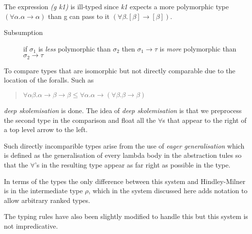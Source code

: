 The expression \textit{(g k1)} is ill-typed since \textit{k1} expects a more polymorphic type $(\forall\alpha. \alpha \rightarrow \alpha)$ than g can pass to it $(\forall\beta.[\beta] \rightarrow [\beta])$. 

\begin{description}
\item[Subsumption] if $\sigma_1$ is \textit{less} polymorphic than $\sigma_2$ then $\sigma_1 \rightarrow \tau$ is \textit{more} polymorphic than $\sigma_2 \rightarrow \tau$
\end{description}

To compare types that are isomorphic but not directly comparable due to the location of the foralls. Such as
\begin{quotation}
$\forall\alpha\beta.\alpha\rightarrow\beta\rightarrow\beta\leq\forall\alpha.\alpha\rightarrow(\forall\beta.\beta\rightarrow\beta)$
\end{quotation}

\textit{deep skolemisation} is done. The idea of \textit{deep skolemisation} is that we preprocess the second type in the comparison and float all the $\forall$s that appear to the right of a top level arrow to the left.

Such directly incomparible types arise from the use of \textit{eager generalisation} which is defined as the generalisation of every lambda body in the abstraction tules so that the $\forall$'s in the resulting type appear as far right as possible in the type.

In terms of the types the only difference between this system and Hindley-Milner is in the intermediate type $\rho$, which in the system discussed here adds notation to allow arbitrary ranked types.

The typing rules have also been slightly modified to handle this but this system is not impredicative.
